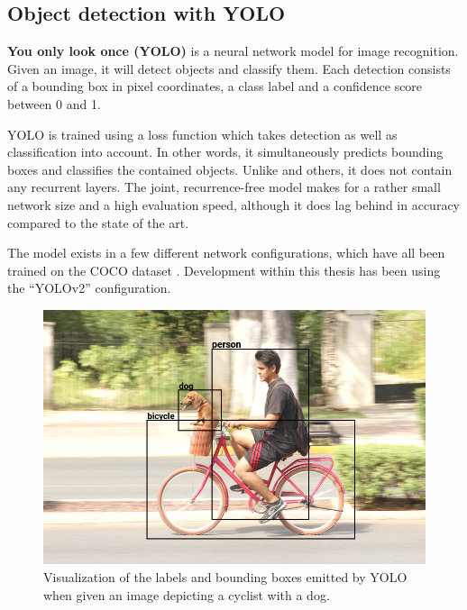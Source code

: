 


\subsection{Object detection with YOLO}

\textbf{You only look once (YOLO)} \citep{RedmonYouOnlyLook2015} is a neural network model for image recognition.
Given an image, it will detect objects and classify them.
Each detection consists of a bounding box in pixel coordinates, a class label and a confidence score between 0 and 1.

YOLO is trained using a loss function which takes detection as well as classification into account.
In other words, it simultaneously predicts bounding boxes and classifies the contained objects.
Unlike \cite{HeMaskRCNN2017} and others, it does not contain any recurrent layers.
The joint, recurrence-free model makes for a rather small network size and a high evaluation speed, although it does lag behind in accuracy compared to the state of the art.

The model exists in a few different network configurations, which have all been trained on the COCO dataset \citep{LinMicrosoftCOCOCommon2014}.
Development within this thesis has been using the ``YOLOv2'' configuration.

\begin{figure}[h]
\label{fig:dogbike_annotated}
\includegraphics[width=\textwidth]{dogbike_annotated}
\centering
\caption{Visualization of the labels and bounding boxes emitted by YOLO when given an image depicting a cyclist with a dog.}
\end{figure}

